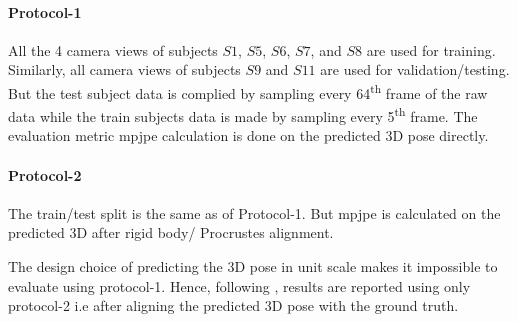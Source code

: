 \paragraph{Protocol-1} All the 4 camera views of subjects $S1$, $S5$, $S6$, $S7$, and $S8$ are used for training. Similarly, all camera views of subjects $S9$ and $S11$ are used for validation/testing. But the test subject data is complied by sampling every 64\textsuperscript{th} frame of the raw data while the train subjects data is made by sampling every 5\textsuperscript{th} frame. 
The evaluation metric \ac{mpjpe} calculation is done on the predicted 3D pose directly.

\paragraph{Protocol-2} The train/test split is the same as of Protocol-1. But \ac{mpjpe} is calculated on the predicted 3D after rigid body/ Procrustes alignment.

The design choice of predicting the 3D pose in unit scale makes it impossible to evaluate using protocol-1. Hence, following \cite{amazon1}, results are reported using only protocol-2 i.e after aligning the predicted 3D pose with the ground truth.






